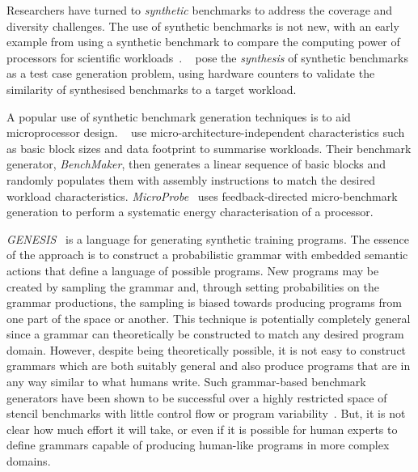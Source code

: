 Researchers have turned to \emph{synthetic} benchmarks to address the coverage and diversity challenges.
The use of synthetic benchmarks is not new, with an early example from \citeyear{Curnow1976} using a synthetic benchmark to compare the computing power of processors for scientific workloads~\cite{Curnow1976}.
\citeauthor{Bell2005}~\cite{Bell2005} pose the \emph{synthesis} of synthetic benchmarks as a test case generation problem, using hardware counters to validate the similarity of synthesised benchmarks to a target workload.

A popular use of synthetic benchmark generation techniques is to aid microprocessor design. \citeauthor{Joshi2008}~\cite{Joshi2008} use micro-architecture-independent characteristics such as basic block sizes and data footprint to summarise workloads. Their benchmark generator, \emph{BenchMaker}, then generates a linear sequence of basic blocks and randomly populates them with assembly instructions to match the desired workload characteristics.
\emph{MicroProbe}~\cite{Bertran2012} uses feedback-directed micro-benchmark generation to perform a systematic energy characterisation of a processor.

\emph{GENESIS}~\cite{Chiu2015} is a language for generating synthetic training programs. The essence of the approach is to construct a probabilistic grammar with embedded semantic actions that define a language of possible programs. New programs may be created by sampling the grammar and, through setting probabilities on the grammar productions, the sampling is biased towards producing programs from one part of the space or another. This technique is potentially completely general since a grammar can theoretically be constructed to match any desired program domain. However, despite being theoretically possible, it is not easy to construct grammars which are both suitably general and also produce programs that are in any way similar to what humans write. Such grammar-based benchmark generators have been shown to be successful over a highly restricted space of stencil benchmarks with little control flow or program variability~\cite{Garvey2015b,Falch2015,Cummins2015}. But, it is not clear how much effort it will take, or even if it is possible for human experts to define grammars capable of producing human-like programs in more complex domains.


